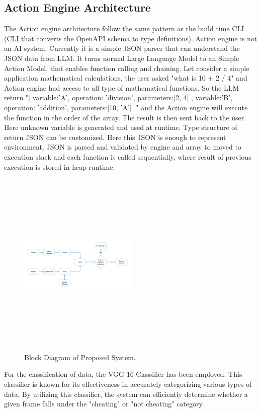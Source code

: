 \documentclass[conference]{IEEEtran}
\begin{document}
\subsection{Action Engine Architecture}
The Action engine architecture follow the same pattern as the build time CLI (CLI that converts the OpenAPI schema to type definitions). Action engine is not an AI system. Currently it is a simple JSON parser that can understand the JSON data from LLM. It turns normal Large Language Model to an Simple Action Model, that enables function calling and chaining. Let consider a simple application mathematical calculations, the user asked "what is 10 + 2 / 4" and Action engine had access to all type of mathematical functions. So the LLM return "[{ variable:'A', operation: 'division', parameters:[2, 4] }, { variable:'B', operation: 'addition', parameters:[10, 'A'] }]" and the Action engine will execute the function in the order of the array. The result is then sent back to the user. Here unknown variable is generated and used at runtime. Type structure of return JSON can be customized. Here this JSON is enough to represent environment. JSON is parsed and validated by engine and array to moved to execution stack and each function is called sequentially, where result of previous execution is stored in heap runtime.

\begin{figure}[htbp]
\centering
\includegraphics[width=0.5\textwidth, height=9cm]{images/ARC.jpeg}
\caption{Block Diagram of Proposed System.}
\label{fig}
\end{figure}

For the classification of data, the VGG-16 Classifier has been employed. This classifier is known for its effectiveness in accurately categorizing various types of data. By utilizing this classifier, the system can efficiently determine whether a given frame falls under the "cheating" or "not cheating" category.
\end{document}
